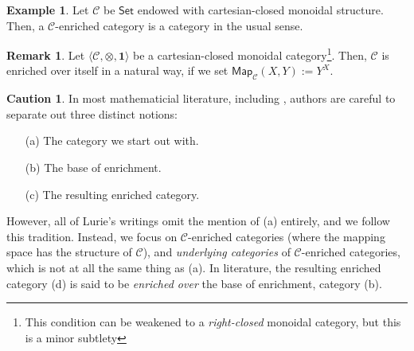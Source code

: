 \documentclass[10pt]{amsart}
\newcommand{\8}{\ensuremath{\infty}}
\newcommand{\0}{\ensuremath{\overset{\rightarrow}{0}}}
\newcommand{\1}{\ensuremath{\mathbf{1}}}
\newcommand{\C}{\ensuremath{\mathscr{C}}}
\newcommand{\Set}{\ensuremath{\mathsf{Set}}}
\newcommand{\Map}{\ensuremath{\mathsf{Map}}}
\newcommand{\langrang}[1]{\ensuremath{\langle {#1} \rangle}}
\theoremstyle{definition}
\newtheorem{remark}[definition]{Remark}
\newtheorem{example}[definition]{Example}
\newtheorem{caution}[definition]{Caution}
\numberwithin{definition}{subsection}
\numberwithin{definition}{section}
\begin{document}
\begin{example}
  Let $\C$ be $\Set$ endowed with cartesian-closed monoidal structure. Then, a \C-enriched category is a category in the usual sense.
\end{example}

\begin{remark}
  Let $\langrang{\C, \otimes, \1}$ be a cartesian-closed monoidal category\footnote{This condition can be weakened to a \emph{right-closed} monoidal category, but this is a minor subtlety}. Then, $\C$ is enriched over itself in a natural way, if we set $\Map_\C(X, Y) := Y^X$.
\end{remark}

\begin{caution}
  In most mathematicial literature, including \cite{Riehl11}, authors are careful to separate out three distinct notions:

  \begin{enumerate}
    \item[(a)] The category we start out with.
    \item[(b)] The base of enrichment.
    \item[(c)] The resulting enriched category.
  \end{enumerate}

  However, all of Lurie's writings omit the mention of (a) entirely, and we follow this tradition. Instead, we focus on \C-enriched categories (where the mapping space has the structure of \C), and \emph{underlying categories} of \C-enriched categories, which is not at all the same thing as (a). In literature, the resulting enriched category (d) is said to be \emph{enriched over} the base of enrichment, category (b).
\end{caution}
\end{document}

